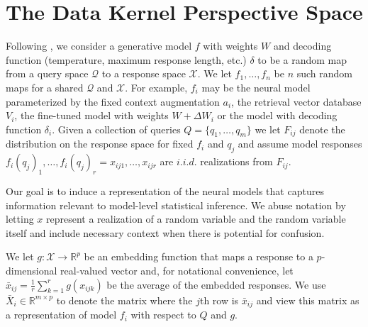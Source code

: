 \section{The Data Kernel Perspective Space}

Following \cite{aranyak}, we consider a generative model $ f $ with weights $ W $ and decoding function (temperature, maximum response length, etc.) $ \delta $ to be a random map from a query space $ \mathscr{Q} $ to a response space $ \mathcal{X} $.
We let $ f_{1}, \hdots, f_{n} $ be $ n $ such random maps for a shared $ \mathscr{Q} $ and $\mathcal{X} $. 
For example, $ f_{i} $ may be the neural model parameterized by the fixed context augmentation $ a_{i} $, the retrieval vector database $ V_{i} $, the fine-tuned model with weights $ W + \Delta W_{i} $ or the model with decoding function $ \delta_{i} $. 
Given a collection of queries $ Q = \{q_{1}, \hdots, q_{m}\} $ 
we let $ F_{ij} $ denote the distribution on the response space for fixed $ f_{i} $ and $ q_{j} $ and assume model responses $ f_{i}(q_{j})_{1}, \hdots, f_{i}(q_{j})_{r} = x_{ij1}, \hdots, x_{ijr} $ are $ i.i.d. $ realizations from $ F_{ij} $. 

Our goal is to induce a representation of the neural models that captures information relevant to model-level statistical inference.
We abuse notation by letting $ x $ represent a realization of a random variable and the random variable itself and include necessary context when there is potential for confusion. 

We let $ g: \mathcal{X} \to \mathbb{R}^{p} $ be an embedding function that maps a response to a $p$-dimensional real-valued vector and, for notational convenience, let $ \bar{x}_{ij} = \frac{1}{r} \sum_{k=1}^{r} g(x_{ijk}) $ be the average of the embedded responses. 
We use $ \bar{X}_{i} \in \mathbb{R}^{m \times p}$ to denote the matrix where the $ j $th row is $ \bar{x}_{ij} $ and view this matrix as a representation of model $ f_{i} $ with respect to $ Q $ and $ g $. 

